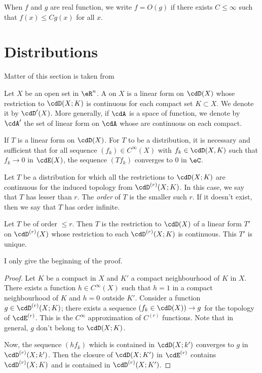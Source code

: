 When $f$ and $g$ are real function, we write $f=O(g)$ if there exists $C\leq\infty$ such that $f(x)\leq Cg(x)$ for all $x$.

\section{Distributions}\label{sec:Distrib}

Matter of this section is taken from \cite{Treves,Dieu3}

Let $X$ be an open set in $\eR^n$. A  on $X$ is a linear form on $\cdD(X)$ whose restriction to $\cdD(X;K)$ is continuous for each compact set $K\subset X$. We denote it by $\cdD'(X)$. More generally, if $\cdA$ is a space of function, we denote by $\cdA'$ the set of linear form on $\cdA$ whose are continuous on each compact.

If $T$ is a linear form on $\cdD(X)$. For $T$ to be a distribution, it is necessary and sufficient that for all sequence $(f_k)\in C^{\infty}(X)$  with $f_k\in\cdD(X,K)$ such that $f_k\to 0$ in $\cdE(X)$, the sequence $(Tf_k)$ converges to $0$ in $\eC$.

Let $T$ be a distribution for which all the restrictions to $\cdD(X;K)$ are continuous for the induced topology from $\cdD^{(r)}(X;K)$. In this case, we say that $T$ has \label{pg:reforder} lesser than $r$. The \emph{order} of $T$ is the smaller such $r$. If it doesn't exist, then we say that $T$ has order infinite.

\begin{proposition}
	Let $T$ be of order $\leq r$. Then $T$ is the restriction to $\cdD(X)$ of a linear form $T'$ on $\cdD^{(r)}(X)$ whose restriction to each $\cdD^{(r)}(X;K)$ is continuous. This $T'$ is unique.
\end{proposition}

I only give the beginning of the proof.

\begin{proof}
	Let $K$ be a compact in  $X$ and $K'$ a compact neighbourhood of $K$ in $X$. There exists a function $h\in C^{\infty}(X)$ such that $h=1$ in a compact neighbourhood of $K$ and $h=0$ outside $K'$. Consider a function $g\in\cdD^{(r)}(X;K)$; there exists a sequence $(f_k\in\cdD(X))\to g$ for the topology of $\cdE^{(r)}$. This is the $ C^{\infty}$ approximation of $C^{(r)}$ functions. Note that in general, $g$ don't belong to $\cdD(X;K)$.

	Now, the sequence $(hf_k)$ which is contained in $\cdD(X;k')$ converges to $g$ in $\cdD^{(r)}(X;k')$. Then the closure of $\cdD(X;K')$ in $\cdE^{(r)}$ contains $\cdD^{(r)}(X;K)$ and is contained in $\cdD^{(r)}(X;K')$.
\end{proof}

